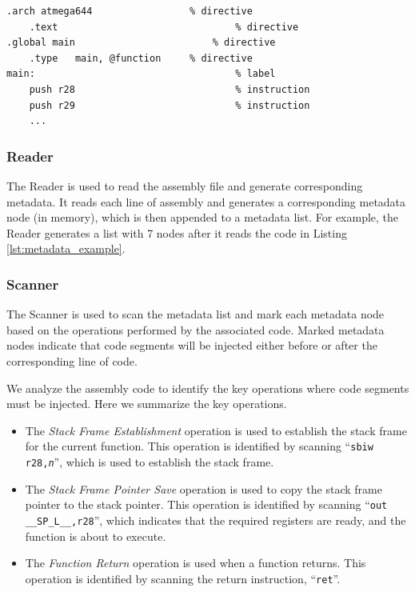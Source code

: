 \begin{lstlisting}[float=tb,label=lst:metadata_example,caption=Assembly Code Example]
.arch atmega644					% directive
	.text								% directive
.global	main						% directive
	.type	main, @function		% directive
main:									% label
	push r28							% instruction
	push r29							% instruction
	...
\end{lstlisting}

\subsubsection{Reader}

The Reader is used to read the assembly file and generate corresponding metadata. It reads each line of assembly and generates a corresponding metadata node (in memory), which is then appended to a metadata list. For example, the Reader generates a list with 7 nodes after it reads the code in Listing \ref{lst:metadata_example}.%

\subsubsection{Scanner}\label{sec:scanner}

The Scanner is used to scan the metadata list and mark each metadata node based on the operations performed by the associated code. Marked metadata nodes indicate that code segments will be injected either before or after the corresponding line of code.

We analyze the assembly code to identify the key operations where code segments must be injected. Here we summarize the key operations.

\begin{itemize} \itemsep 0in
\item The \textit{Stack Frame Establishment} operation is used to establish the stack frame for the current function. This operation is identified by scanning ``\texttt{sbiw r28,\textit{n}}'', which is used to establish the stack frame.

\item The \textit{Stack Frame Pointer Save} operation is used to copy the stack frame pointer to the stack pointer. This operation is identified by scanning ``\texttt{out \_\_SP\_L\_\_,r28}'', which indicates that the required registers are ready, and the function is about to execute. 

\item The \textit{Function Return} operation is used when a function returns. This operation is identified by scanning the return instruction, ``\texttt{ret}''.
\end{itemize}

